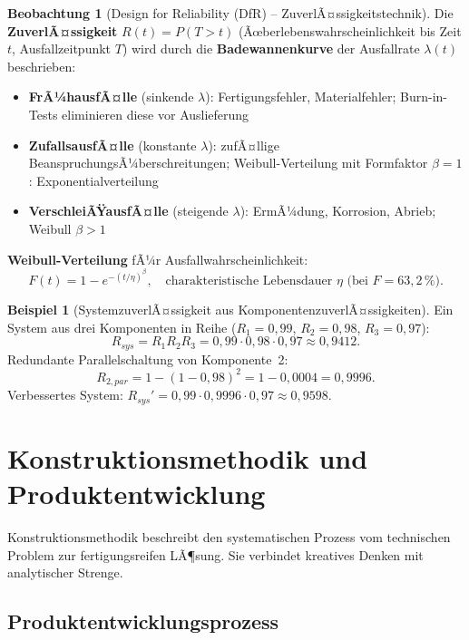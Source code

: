 ﻿\documentclass[a4paper,12pt]{report}
\theoremstyle{definition}
\newtheorem{beispiel}{Beispiel}
\newtheorem{beobachtung}{Beobachtung}
\begin{document}
\begin{beobachtung}[Design for Reliability (DfR) -- ZuverlÃ¤ssigkeitstechnik]
Die \textbf{ZuverlÃ¤ssigkeit} $R(t) = P(T > t)$ (Ãœberlebenswahrscheinlichkeit
bis Zeit $t$, Ausfallzeitpunkt $T$) wird durch die \textbf{Badewannenkurve}
der Ausfallrate $\lambda(t)$ beschrieben:
\begin{itemize}
    \item[-] \textbf{FrÃ¼hausfÃ¤lle} (sinkende $\lambda$): Fertigungsfehler, Materialfehler;
          Burn-in-Tests eliminieren diese vor Auslieferung
    \item[-] \textbf{ZufallsausfÃ¤lle} (konstante $\lambda$): zufÃ¤llige BeanspruchungsÃ¼berschreitungen;
          Weibull-Verteilung mit Formfaktor $\beta = 1$: Exponentialverteilung
    \item[-] \textbf{VerschleiÃŸausfÃ¤lle} (steigende $\lambda$): ErmÃ¼dung, Korrosion, Abrieb;
          Weibull $\beta > 1$
\end{itemize}
\textbf{Weibull-Verteilung} fÃ¼r Ausfallwahrscheinlichkeit:
\[
  F(t) = 1 - e^{-(t/\eta)^\beta},
  \quad \text{charakteristische Lebensdauer } \eta \text{ (bei } F = 63{,}2\,\%).
\]
\end{beobachtung}

\begin{beispiel}[SystemzuverlÃ¤ssigkeit aus KomponentenzuverlÃ¤ssigkeiten]
Ein System aus drei Komponenten in Reihe ($R_1 = 0{,}99$, $R_2 = 0{,}98$, $R_3 = 0{,}97$):
\[
  R_{sys} = R_1 R_2 R_3 = 0{,}99 \cdot 0{,}98 \cdot 0{,}97 \approx 0{,}9412.
\]
Redundante Parallelschaltung von Komponente~2:
\[
  R_{2,par} = 1 - (1-0{,}98)^2 = 1 - 0{,}0004 = 0{,}9996.
\]
Verbessertes System: $R_{sys}' = 0{,}99 \cdot 0{,}9996 \cdot 0{,}97 \approx 0{,}9598$.
\end{beispiel}

\chapter{Konstruktionsmethodik und Produktentwicklung}

Konstruktionsmethodik beschreibt den systematischen Prozess vom
technischen Problem zur fertigungsreifen LÃ¶sung. Sie verbindet
kreatives Denken mit analytischer Strenge.

\section{Produktentwicklungsprozess}
\end{document}
